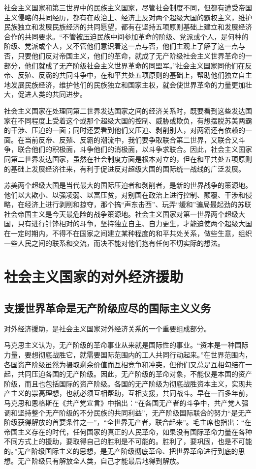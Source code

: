 \documentclass{book}
\begin{document}
社会主义国家和第三世界中的民族主义国家，尽管社会制度不同，但都有遭受帝国主义侵略的共同经历，都有在政治上、经济上反对两个超级大国的霸权主义，维护民族独立和发展民族经济的共同愿望，都有在坚持五项原则基础上建立和发展经济合作的共同要求。“不管被压迫民族中间参加革命的阶级、党派或个人，是何种的阶级、党派或个人，又不管他们意识着这一点与否，他们主观上了解了这一点与否，只要他们反对帝国主义，他们的革命，就成了无产阶级社会主义世界革命的一部分，他们就成了无产阶级社会主义世界革命的同盟军。”社会主义国家同他们在反帝、反殖、反霸的共同斗争中，在和平共处五项原则的基础上，帮助他们独立自主地发展民族经济，维护他们的民族独立和国家主权，就会使世界革命的力量更加壮大，促进人类的共同进步。

社会主义国家在处理同第二世界发达国家之间的经济关系时，既要看到这些发达国家在不同程度上受着这个或那个超级大国的控制、威胁或欺负，有想摆脱苏美两霸的干涉、压迫的一面；同时还要看到他们又压迫、剥削别人，对两霸还有依赖的一面。在当前反帝、反殖、反霸的潮流中，我们要争取联合第二世界，又联合又斗争，联合他们的积极面，斗争他们的消极面，以斗争求联合。因此，社会主义国家同第二世界发达国家，虽然在社会制度方面是根本对立的，但在和平共处五项原则的基础上发展经济往来，有利于促进反对超级大国的国际统一战线的广泛发展。

苏美两个超级大国是当代最大的国际压迫者和剥削者，是新的世界战争的策源地。他们以大欺小、以强凌弱、以富压贫，对别国在政治上进行控制、颠覆、干涉和侵略，在经济上进行剥削和掠夺，那个搞“声东击西”、玩弄“缓和”骗局最起劲的苏联社会帝国主义是今天最危险的战争策源地。社会主义国家对第一世界两个超级大国，只有进行针锋相对的斗争，坚持独立自主、自力更生，才能迫使两个超级大国在一定时期内，不得不在国家之间建立某种程度的和平共处关系，做些生意，组织一些人民之间的联系和交流，而决不能对他们抱有任何不切实际的想法。


\section{社会主义国家的对外经济援助}

\subsection{支援世界革命是无产阶级应尽的国际主义义务}

对外经济援助，是社会主义国家对外经济关系的一个重要组成部分。

马克思主义认为，无产阶级的革命事业从来就是国际性的事业。“资本是一种国际力量，要想彻底战胜它，就需要国际范围内的工人共同行动起来。”在世界范围内，各国资产阶级虽然为摄取剩余价值而互相竞争和冲突，但他们又总是互相勾结在一起，共同压迫各国的无产阶级。因此，无产阶级的革命对象，不能仅是本国的资产阶级，而且也包括国际的资产阶级。各国的无产阶级为彻底战胜资本主义，实现共产主义的祟高理想，也就必须互相帮助，互相支援，共同战斗。早在一百多年前，马克思和恩格斯在《共产党宣言》中指出：“在各国无产者的斗争中，共产党人强调和坚持整个无产阶级的不分民族的共同利益”，无产阶级国际联合的努力“是无产阶级获得解放的首要条件之一”，“全世界无产者，联合起来”。毛主席也指出：“在帝国主义存在的时代，任何国家的真正的人民革命，如果没有国际革命力量在各种不同方式上的援助，要取得自己的胜利是不可能的。胜利了，要巩固，也是不可能的。”无产阶级国际主义的思想，是无产阶级彻底革命、把世界革命进行到底的思想。无产阶级只有解放全人类，自己才能最后地得到解放。
\end{document}
